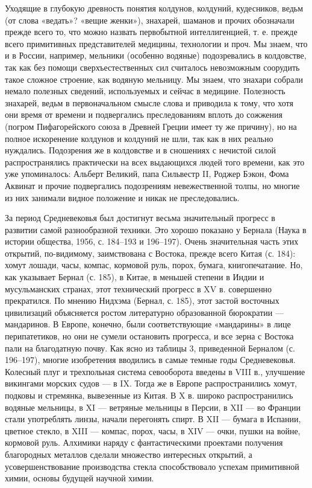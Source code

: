 Уходящие в глубокую древность  понятия колдунов, колдуний, кудесников,
ведьм  (от  слова  «ведать»?   «вещие  женки»),  знахарей,  шаманов  и
прочих  обозначали  прежде всего  то,  что  можно назвать  первобытной
интеллигенцией,   т.  е.   прежде  всего   примитивных  представителей
медицины,  технологии и  проч. Мы  знаем,  что и  в России,  например,
мельники (особенно  водяные) подозревались  в колдовстве, так  как без
помощи  сверхъестественных сил  считалось невозможным  соорудить такое
сложное строение, как водяную мельницу.  Мы знаем, что знахари собрали
немало полезных сведений, используемых и сейчас в медицине. Полезность
знахарей, ведьм в первоначальном смысле  слова и приводила к тому, что
хотя  они время  от времени  и подвергались  преследованиям вплоть  до
сожжения (погром  Пифагорейского союза  в Древней  Греции имеет  ту же
причину), но на полное искоренение колдунов и колдуний не шли, так как
в них  реально нуждались. Подозрения же  в колдовстве и в  сношениях с
нечистой силой  распространялись практически на всех  выдающихся людей
того времени, как это уже упоминалось: Альберт Великий, папа Сильвестр
II,  Роджер  Бэкон, Фома  Аквинат  и  прочие подвергались  подозрениям
невежественной толпы,  но многие  из них  занимали видное  положение и
никак не преследовались.

За период  Средневековья был достигнут весьма  значительный прогресс в
развитии самой  разнообразной техники.  Это хорошо показано  у Бернала
(Наука  в  истории общества,  1956,  с.  184--193 и  196--197).  Очень
значительная часть этих открытий, по-видимому, заимствована с Востока,
прежде  всего Китая  (с. 184):  хомут лошади,  часы, компас,  кормовой
руль,  порох, бумага,  книгопечатание.  Но, как  указывает Бернал  (с.
185), в Китае, в меньшей степени в Индии и мусульманских странах, этот
технический прогресс в XV в. совершенно прекратился. По мнению Нидхэма
(Бернал,  с.  185),  этот  застой  восточных  цивилизаций  объясняется
ростом литературно  образованной бюрократии --- мандаринов.  В Европе,
конечно, были соответствующие «мандарины» в лице перипатетиков, но они
не  сумели  остановить  прогресса,  и  все зерна  с  Востока  пали  на
благодатную  почву.  Как  ясно  из  таблицы  3,  приведенной  Берналом
(с.  196--197),  многие  изобретения  вводились в  самые  темные  годы
Средневековья. Колесный плуг и трехпольная система севооборота введены
в VIII  в., улучшение  викингами морских  судов --- в  IX. Тогда  же в
Европе  распространились хомут,  подковы  и  стремянка, вывезенные  из
Китая.  В X  в. широко  распространились  водяные мельницы,  в XI  ---
ветряные мельницы  в Персии,  в XII ---  во Франции  стали употреблять
линзы, начали  перегонять спирт. В  XII --- бумага в  Испании, цветное
стекло,  в XIII  --- компас,  порох, часы,  в XIV  --- очки,  пушки на
войне,  кормовой руль.  Алхимики  наряду  с фантастическими  проектами
получения благородных металлов  сделали множество интересных открытий,
а  усовершенствование   производства  стекла   способствовало  успехам
примитивной химии, основы будущей научной химии.

